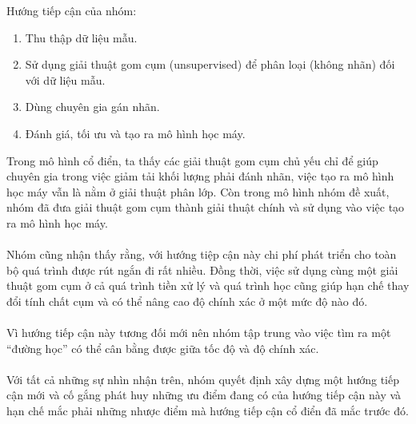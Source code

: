   Hướng tiếp cận của nhóm:
\begin{enumerate}
  \item Thu thập dữ liệu mẫu.
  \item Sử dụng giải thuật gom cụm (unsupervised) để phân loại (không nhãn) đối
  với dữ liệu mẫu.
  \item Dùng chuyên gia gán nhãn.
  \item Đánh giá, tối ưu và tạo ra mô hình học máy.
\end{enumerate}
  Trong mô hình cổ điển, ta thấy các giải thuật gom cụm chủ yếu chỉ để giúp
chuyên gia trong việc giảm tải khối lượng phải đánh nhãn, việc tạo ra mô hình
học máy vẫn là nằm ở giải thuật phân lớp. Còn trong mô hình nhóm đề xuất, nhóm đã đưa
giải thuật gom cụm thành giải thuật chính và sử dụng vào việc tạo ra mô hình học
máy.\\\\ 
Nhóm cũng nhận thấy rằng, với hướng tiệp cận này chi phí phát
triển cho toàn bộ quá trình được rút ngắn đi rất nhiều. Đồng thời, việc sử dụng 
cùng một giải thuật gom cụm ở cả quá trình tiền xử lý và quá trình học cũng giúp
hạn chế thay đổi tính chất cụm và có thể nâng cao độ chính xác ở một mức độ
nào đó.\\\\ 
Vì hướng tiếp cận này tương đối mới nên nhóm tập trung vào việc
tìm ra một “đường học” có thể cân bằng được giữa tốc độ và độ chính
xác.\\\\ 
Với tất cả những sự nhìn nhận trên, nhóm quyết định xây dựng một
hướng tiếp cận mới và cố gắng phát huy những ưu điểm đang có của hướng tiếp cận
này và hạn chế mắc phải những nhược điểm mà hướng tiếp cận cổ điển đã mắc trước
đó.   
